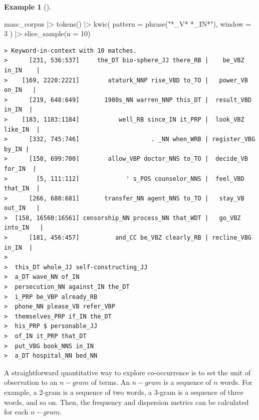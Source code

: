 \documentclass[
  letterpaper,
  DIV=11,
  numbers=noendperiod]{scrreport}
\newenvironment{Shaded}{\begin{snugshade}}{\end{snugshade}}
\newcommand{\AttributeTok}[1]{\textcolor[rgb]{0.00,0.00,0.00}{#1}}
\newcommand{\DecValTok}[1]{\textcolor[rgb]{0.00,0.00,0.00}{#1}}
\newcommand{\FunctionTok}[1]{\textcolor[rgb]{0.00,0.00,0.00}{#1}}
\newcommand{\NormalTok}[1]{\textcolor[rgb]{0.00,0.00,0.00}{#1}}
\newcommand{\SpecialCharTok}[1]{\textcolor[rgb]{0.00,0.00,0.00}{#1}}
\newcommand{\StringTok}[1]{\textcolor[rgb]{0.00,0.00,0.00}{#1}}
\theoremstyle{definition}
\newtheorem{example}{Example}[chapter]
\theoremstyle{remark}
\begin{document}
\begin{example}[]
\begin{Shaded}
\begin{Highlighting}[]
\NormalTok{masc\_corpus }\SpecialCharTok{|\textgreater{}} 
  \FunctionTok{tokens}\NormalTok{() }\SpecialCharTok{|\textgreater{}} 
  \FunctionTok{kwic}\NormalTok{(}
    \AttributeTok{pattern =} \FunctionTok{phrase}\NormalTok{(}\StringTok{"*\_V* *\_IN*"}\NormalTok{),}
    \AttributeTok{window =} \DecValTok{3}
\NormalTok{  ) }\SpecialCharTok{|\textgreater{}} 
  \FunctionTok{slice\_sample}\NormalTok{(}\AttributeTok{n =} \DecValTok{10}\NormalTok{)}
\end{Highlighting}
\end{Shaded}

\begin{verbatim}
> Keyword-in-context with 10 matches.                                                                            
>      [231, 536:537]     the_DT bio-sphere_JJ there_RB |    be_VBZ in_IN    |
>    [169, 2220:2221]        ataturk_NNP rise_VBD to_TO |   power_VB on_IN   |
>      [219, 648:649]       1980s_NN warren_NNP this_DT |  result_VBD in_IN  |
>    [183, 1183:1184]           well_RB since_IN it_PRP |  look_VBZ like_IN  |
>      [332, 745:746]                    . _NN when_WRB | register_VBG by_IN |
>      [150, 699:700]        allow_VBP doctor_NNS to_TO |  decide_VB for_IN  |
>        [5, 111:112]             ' s_POS counselor_NNS |  feel_VBD that_IN  |
>      [266, 680:681]       transfer_NN agent_NNS to_TO |   stay_VB out_IN   |
>  [158, 16560:16561] censorship_NN process_NN that_WDT |   go_VBZ into_IN   |
>      [181, 456:457]          and_CC be_VBZ clearly_RB | recline_VBG in_IN  |
>                                       
>  this_DT whole_JJ self-constructing_JJ
>  a_DT wave_NN of_IN                   
>  persecution_NN against_IN the_DT     
>  i_PRP be_VBP already_RB              
>  phone_NN please_VB refer_VBP         
>  themselves_PRP if_IN the_DT          
>  his_PRP $ personable_JJ              
>  of_IN it_PRP that_DT                 
>  put_VBG book_NNS in_IN               
>  a_DT hospital_NN bed_NN
\end{verbatim}

\end{example}

A straightforward quantitative way to explore co-occurrence is to set
the unit of observation to an \(n-gram\) of terms. An \(n-gram\) is a
sequence of \(n\) words. For example, a 2-gram is a sequence of two
words, a 3-gram is a sequence of three words, and so on. Then, the
frequency and dispersion metrics can be calculated for each \(n-gram\).
\end{document}
